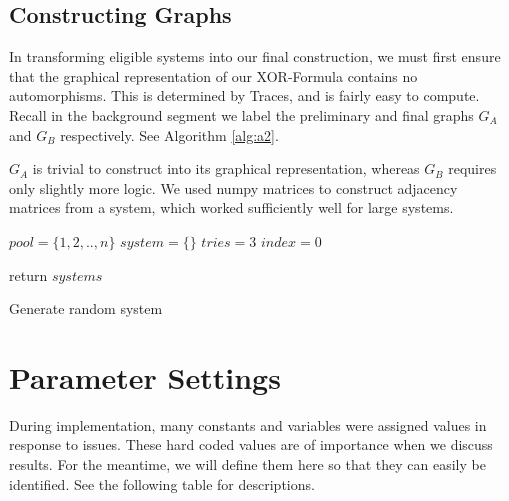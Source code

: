 \subsection{Constructing Graphs}
In transforming eligible systems into our final construction, we must first ensure that the graphical representation of our XOR-Formula contains no automorphisms. This is determined by Traces, and is fairly easy to compute. Recall in the background segment we label the preliminary and final graphs $G_A$ and $G_B$ respectively. See Algorithm \ref{alg:a2}.
\par
$G_A$ is trivial to construct into its graphical representation, whereas $G_B$ requires only slightly more logic. We used numpy matrices to construct adjacency matrices from a system, which worked sufficiently well for large systems. 
\begin{algorithm}[htbp!]
		\SetAlgoNoLine
		$pool = \{1,2,..,n\}$\;
		$system=\{\}$\;
		$tries=3$\;
		$index=0$\;
		
	
	return $systems$
	\caption{Generate random system}
	\label{alg:a2}
\end{algorithm}



\newpage
\section{Parameter Settings}
During implementation, many constants and variables were assigned values in response to issues. These hard coded values are of importance when we discuss results. For the meantime, we will define them here so that they can easily be identified. See the following table for descriptions.

